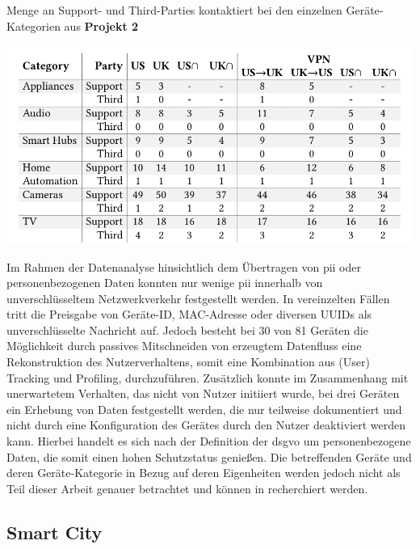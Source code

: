 \begin{table}
    \caption{Menge an Support- und Third-Parties kontaktiert bei den einzelnen Geräte-Kategorien aus \textbf{Projekt 2} \cite{Ren2019}}
    \includegraphics[width=\textwidth]{main/pictures/projekt_two/Non_First_Party_By_Category}
    \label{table:non-first-party-by-device}
\end{table}

\noindent Im Rahmen der Datenanalyse hinsichtlich dem Übertragen von \ac{pii} oder personenbezogenen Daten konnten nur wenige \ac{pii} innerhalb von unverschlüsseltem Netzwerkverkehr festgestellt werden. In vereinzelten Fällen tritt die Preisgabe von Geräte-ID, MAC-Adresse oder diversen UUIDs als unverschlüsselte Nachricht auf. 
Jedoch besteht bei 30 von 81 Geräten die Möglichkeit durch passives Mitschneiden von erzeugtem Datenfluss eine Rekonstruktion des Nutzerverhaltens, somit eine Kombination aus (User) Tracking und Profiling, durchzuführen. 
Zusätzlich konnte im Zusammenhang mit unerwartetem Verhalten, das nicht von Nutzer initiiert wurde, bei drei Geräten ein Erhebung von Daten festgestellt werden, die nur teilweise dokumentiert und nicht durch eine Konfiguration des Gerätes durch den Nutzer deaktiviert werden kann. 
Hierbei handelt es sich nach der Definition der \ac{dsgvo} um personenbezogene Daten, die somit einen hohen Schutzstatus genießen. Die betreffenden Geräte und deren Geräte-Kategorie in Bezug auf deren Eigenheiten werden jedoch nicht als Teil dieser Arbeit genauer betrachtet und können in \cite{Ren2019} recherchiert werden.

\subsection{Smart City}
\label{sec:Analyse der Datenerhebung:ssec:Smart City}

